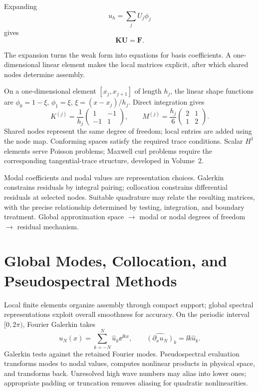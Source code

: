 Expanding
\[
u_h=\sum_jU_j\phi_j
\]
gives
\[
\bm K\bm U=\bm F.
\]

The expansion turns the weak form into equations for basis coefficients. A one-dimensional linear element makes the local matrices explicit, after which shared nodes determine assembly.


On a one-dimensional element $[x_j,x_{j+1}]$ of length $h_j$, the linear shape functions are
$\phi_0=1-\xi$, $\phi_1=\xi$, $\xi=(x-x_j)/h_j$.
Direct integration gives
\[
K^{(j)}=\frac1{h_j}\begin{pmatrix}1&-1\\-1&1\end{pmatrix},
\qquad
M^{(j)}=\frac{h_j}6\begin{pmatrix}2&1\\1&2\end{pmatrix}.
\]
Shared nodes represent the same degree of freedom; local entries are added using the node map.
Conforming spaces satisfy the required trace conditions. Scalar $H^1$ elements serve Poisson problems;
Maxwell curl problems require the corresponding tangential-trace structure, developed in Volume~2.

{Modal coefficients and nodal values are representation choices. Galerkin constrains residuals by integral pairing; collocation constrains differential residuals at selected nodes. Suitable quadrature may relate the resulting matrices, with the precise relationship determined by testing, integration, and boundary treatment.}
{Global approximation space $\longrightarrow$ modal or nodal degrees of freedom $\longrightarrow$ residual mechanism.}

\section{Global Modes, Collocation, and Pseudospectral Methods}
Local finite elements organize assembly through compact support; global spectral representations exploit overall smoothness for accuracy. On the periodic interval $[0,2\pi)$, Fourier Galerkin takes
\[
u_N(x)=\sum_{k=-N}^{N}\widehat u_k\ee^{\ii kx},\qquad
\widehat{(\partial_xu_N)}_k=\ii k\widehat u_k.
\]
Galerkin tests against the retained Fourier modes. Pseudospectral evaluation transforms modes to nodal values,
computes nonlinear products in physical space, and transforms back. Unresolved high wave numbers may alias into lower ones;
appropriate padding or truncation removes aliasing for quadratic nonlinearities.

